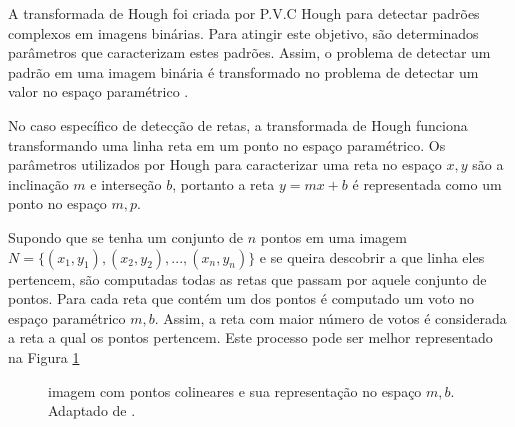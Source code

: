 A transformada de Hough foi criada por P.V.C Hough para detectar padrões complexos em imagens binárias. Para atingir este objetivo, são determinados parâmetros que caracterizam estes padrões. Assim, o problema de detectar um padrão em uma imagem binária é transformado no problema de detectar um valor no espaço paramétrico \cite{houghintro01}.


No caso específico de detecção de retas, a transformada de Hough funciona transformando uma linha reta em um ponto no espaço paramétrico. Os parâmetros utilizados por Hough para caracterizar uma reta no espaço $x,y$ são a inclinação $m$ e interseção $b$, portanto a reta $y = mx+b$ é representada como um ponto no espaço $m,p$.

Supondo que se tenha um conjunto de $n$ pontos em uma imagem $N = \{(x_1,y_1),(x_2,y_2),...,(x_n,y_n)\}$  e se queira descobrir a que linha eles pertencem, são computadas todas as retas que passam por aquele conjunto de pontos. Para cada reta que contém um dos pontos é computado um voto no espaço paramétrico $m,b$. Assim, a reta com maior número de votos é considerada a reta a qual os pontos pertencem. Este processo pode ser melhor representado na Figura \ref{houghpuro}

\begin{figure}[h]
  \centering
  \hfill
  \caption{imagem com pontos colineares e sua representação no espaço $m,b$. Adaptado de \cite{houghintro01}.}
  \label{houghpuro}
\end{figure}

